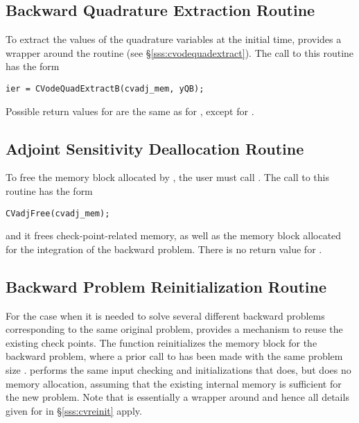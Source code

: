 \subsection{Backward Quadrature Extraction Routine}

To extract the values of the quadrature variables at the initial time,
{\cvodes} provides a wrapper around the routine 
(see \S\ref{sss:cvodequadextract}). The call to this routine has the form
\begin{verbatim}
ier = CVodeQuadExtractB(cvadj_mem, yQB);
\end{verbatim}
Possible return values for  are the same as for
, except for .

\subsection{Adjoint Sensitivity Deallocation Routine}\label{sss:cvadjfree}

To free the  memory block allocated by , the
user must call . The call to this routine has the form
\begin{verbatim}
CVadjFree(cvadj_mem);
\end{verbatim}
and it frees check-point-related memory, as well as the {\cvodes} memory block
allocated for the integration of the backward problem. There is no return 
value for .

\subsection{Backward Problem Reinitialization Routine}\label{sss:cvreinitb}

For the case when it is needed to solve several different backward problems 
corresponding to the same original problem, {\cvodes} provides a mechanism 
to reuse the existing check points. The function  reinitializes
the {\cvodes} memory block for the backward problem, where a prior call to
 has been made with the same problem size .
 performs the same input checking and initializations that 
 does, but does no memory allocation, 
assuming that the existing internal memory is sufficient for the new problem. 
Note that  is essentially a wrapper around 
and hence all details given for  in \S\ref{sss:cvreinit}
apply.

